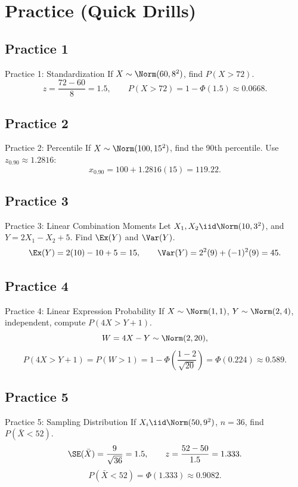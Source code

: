\documentclass[aspectratio=169]{beamer}
\begin{document}
\section{Practice (Quick Drills)}

\subsection{Practice 1}
\begin{frame}{Practice 1: Standardization}
  If \(X\sim\Norm(60,8^2)\), find \(P(X>72)\).
  \pause
  \[
    z=\frac{72-60}{8}=1.5,
    \qquad
    P(X>72)=1-\Phi(1.5)\approx0.0668.
  \]
\end{frame}

\subsection{Practice 2}
\begin{frame}{Practice 2: Percentile}
  If \(X\sim\Norm(100,15^2)\), find the 90th percentile.
  \pause
  Use \(z_{0.90}\approx1.2816\):
  \[
    x_{0.90}=100+1.2816(15)=119.22.
  \]
\end{frame}

\subsection{Practice 3}
\begin{frame}{Practice 3: Linear Combination Moments}
  Let \(X_1,X_2\iid\Norm(10,3^2)\), and \(Y=2X_1-X_2+5\).
  Find \(\Ex(Y)\) and \(\Var(Y)\).
  \pause
  \[
    \Ex(Y)=2(10)-10+5=15,
    \qquad
    \Var(Y)=2^2(9)+(-1)^2(9)=45.
  \]
\end{frame}

\subsection{Practice 4}
\begin{frame}{Practice 4: Linear Expression Probability}
  If \(X\sim\Norm(1,1)\), \(Y\sim\Norm(2,4)\), independent,
  compute \(P(4X>Y+1)\).
  \pause
  \[
    W=4X-Y\sim\Norm(2,20),
  \]
  \[
    P(4X>Y+1)=P(W>1)
    =1-\Phi\!\left(\frac{1-2}{\sqrt{20}}\right)
    =\Phi(0.224)\approx0.589.
  \]
\end{frame}

\subsection{Practice 5}
\begin{frame}{Practice 5: Sampling Distribution}
  If \(X_i\iid\Norm(50,9^2)\), \(n=36\), find \(P(\bar X<52)\).
  \pause
  \[
    \SE(\bar X)=\frac{9}{\sqrt{36}}=1.5,
    \qquad
    z=\frac{52-50}{1.5}=1.333.
  \]
  \[
    P(\bar X<52)=\Phi(1.333)\approx0.9082.
  \]
\end{frame}
\end{document}
